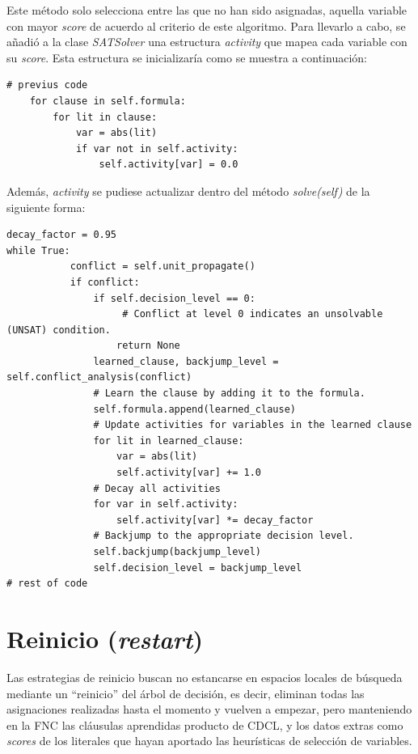 Este método solo selecciona entre las que no han sido asignadas, aquella variable con mayor \textit{score} de acuerdo al criterio de este algoritmo. Para llevarlo a cabo, se añadió a la clase \textit{SATSolver} una estructura \textit{activity} que mapea cada variable con su \textit{score}. Esta estructura se inicializaría como se muestra a continuación:

\begin{lstlisting}
# previus code
    for clause in self.formula:
        for lit in clause:
            var = abs(lit)
            if var not in self.activity:
                self.activity[var] = 0.0
\end{lstlisting}

Además, \textit{activity} se pudiese actualizar dentro del método \textit{solve(self)} de la siguiente forma:

\begin{lstlisting}
decay_factor = 0.95
while True:
           conflict = self.unit_propagate()
           if conflict:
               if self.decision_level == 0:
                    # Conflict at level 0 indicates an unsolvable (UNSAT) condition.
                   return None
               learned_clause, backjump_level = self.conflict_analysis(conflict)
               # Learn the clause by adding it to the formula.
               self.formula.append(learned_clause)
               # Update activities for variables in the learned clause
               for lit in learned_clause:
                   var = abs(lit)
                   self.activity[var] += 1.0
               # Decay all activities
               for var in self.activity:
                   self.activity[var] *= decay_factor
               # Backjump to the appropriate decision level.
               self.backjump(backjump_level)
               self.decision_level = backjump_level
# rest of code
\end{lstlisting}

\section{Reinicio (\textit{restart})}
Las estrategias de reinicio buscan no estancarse en espacios locales de búsqueda mediante un ``reinicio'' del árbol de decisión, es decir, eliminan todas las asignaciones realizadas hasta el momento y vuelven a empezar, pero manteniendo en la FNC las cláusulas aprendidas producto de CDCL, y los datos extras como \textit{scores} de los literales que hayan aportado las heurísticas de selección de variables.

